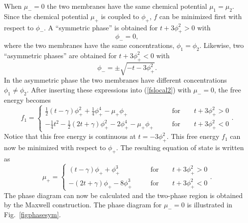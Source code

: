 When $\mu_- = 0$ the
two membranes have the same chemical potential $\mu_1=\mu_2$.
Since the chemical potential $\mu_+$ is coupled to $\phi_+$,
 $f$ can be minimized first with respect to $\phi_-$.
A ``symmetric phase'' is obtained for $t+3\phi_+^2>0$ with
\begin{equation}
\phi_-=0,
\end{equation}
where the two membranes have the same concentrations,
$\phi_1=\phi_2$.
Likewise, two ``asymmetric phases'' are obtained for $t+3\phi_+^2<0$
with
\begin{equation}
\phi_- = \pm \sqrt{-t-3\phi_+^2}.
\end{equation}
In the asymmetric phase the two membranes have  different concentrations
$\phi_1 \neq \phi_2$.
After inserting these expressions into (\ref{fslocal2}) with
$\mu_-=0$, the free energy becomes
\begin{equation}
f_1 = \left\{
\begin{array}{lll}
\frac{1}{2} \left(t - \gamma \right) \phi_+^2
+ \frac{1}{4} \phi_+^4 -\mu_+ \phi_+ & ~~~~~ & \mbox{for~~~~~ $t+3\phi_+^2>0$} \\
- \frac{1}{4}t^2 - \frac{1}{2}\left(2t + \gamma \right) \phi_+^2
- 2 \phi_+^4 -\mu_+ \phi_+ & ~~~~~ & \mbox{for~~~~~ $t+3\phi_+^2<0$}
\end{array} \right..
\label{fsmin2}
\end{equation}
Notice that this free energy is continuous at $t=-3\phi_+^2$.
This free energy $f_1$ can now be minimized with respect to $\phi_+$.
The resulting
equation of state is written as
\begin{equation}
\mu_+ = \left\{
\begin{array}{lll}
\left(t - \gamma \right) \phi_+ + \phi_+^3
& ~~~~~ & \mbox{for~~~~~ $t+3\phi_+^2>0$} \\
- \left(2t + \gamma \right) \phi_+ - 8 \phi_+^3
& ~~~~~ & \mbox{for~~~~~ $t+3\phi_+^2<0$}
\end{array} \right..
\end{equation}
The phase diagram can now be calculated
and the two-phase region is obtained by the Maxwell
construction.
The phase diagram for $\mu_-=0$ is illustrated in Fig.\
\ref{figphasesym}.



